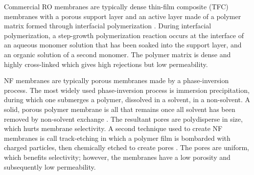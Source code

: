 \documentclass{article}
\begin{document}
  Commercial RO membranes are typically dense thin-film composite (TFC)
  membranes with a porous support layer and an active layer made of a polymer
  matrix formed through interfacial polymerization \cite{jeong_interfacial_2007}.
  During interfacial polymerization, a step-growth polymerization reaction occurs
  at the interface of an aqueous monomer solution that has been soaked into the
  support layer, and an organic solution of a second monomer. The polymer matrix
  is dense and highly cross-linked which gives high rejections but low
  permeability. 

 
  NF membranes are typically porous membranes made by a phase-inversion
  process. The most widely used phase-inversion process is immersion
  precipitation, during which one submerges a polymer, dissolved in a solvent, in
  a non-solvent. A solid, porous polymer membrane is all that remains once all
  solvent has been removed by non-solvent exchange
  \cite{smolders_microstructures_1992}.  The resultant pores are polydisperse in
  size, which hurts membrane selectivity. A second technique used to create NF
  membranes is call track-etching in which a polymer film is bombarded with
  charged particles, then chemically etched to create pores
  \cite{apel_track_2001}. The pores are uniform, which benefits selectivity;
  however, the membranes have a low porosity and subsequently low permeability. 
 

\end{document}
